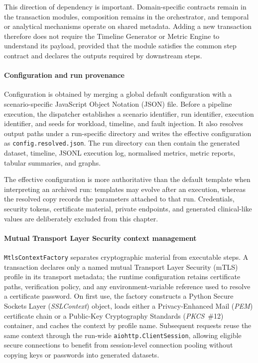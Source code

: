 \noindent This direction of dependency is important. Domain-specific contracts remain in
the transaction modules, composition remains in the orchestrator, and temporal
or analytical mechanisms operate on shared metadata. Adding a new transaction
therefore does not require the Timeline Generator or Metric Engine to understand its
payload, provided that the module satisfies the common step contract and
declares the outputs required by downstream steps.

\paragraph{Configuration and run provenance}
\noindent Configuration is obtained by merging a global default configuration with a scenario-specific JavaScript Object Notation (JSON) file.
Before a pipeline execution, the dispatcher establishes a scenario identifier, run
identifier, execution identifier, and seeds for workload, timeline, and fault
injection. It also resolves output paths under a run-specific directory and
writes the effective configuration as \texttt{config.resolved.json}. The run
directory can then contain the generated dataset, timeline, JSONL execution
log, normalised metrics, metric reports, tabular summaries, and graphs.

\noindent The effective configuration is more authoritative than the default
template when interpreting an archived run: templates may evolve after an
execution, whereas the resolved copy records the parameters attached to that
run. Credentials, security tokens, certificate material, private endpoints,
and generated clinical-like values are deliberately excluded from this
chapter.

\paragraph{Mutual Transport Layer Security context management}
\noindent \texttt{MtlsContextFactory} separates cryptographic material from executable
steps. A transaction declares only a named mutual Transport Layer Security
(mTLS) profile in its transport metadata; the runtime configuration retains
certificate paths, verification policy, and any environment-variable reference
used to resolve a certificate password. On first use, the factory constructs a
Python Secure Sockets Layer (\textit{SSLContext}) object, loads either a Privacy-Enhanced Mail (\textit{PEM}) certificate
chain or a Public-Key Cryptography Standards (\textit{PKCS}~\#12) container, and caches the
context by profile name. Subsequent requests reuse the same context through the
run-wide \texttt{aiohttp.ClientSession}, allowing eligible secure connections
to benefit from session-level connection pooling without copying keys or
passwords into generated datasets.

